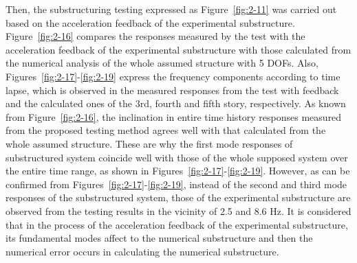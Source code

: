  Then, the substructuring testing expressed as Figure~\ref{fig:2-11} was carried out based on the acceleration feedback of the experimental substructure. Figure~\ref{fig:2-16} compares the responses measured by the test with the acceleration feedback of the experimental substructure with those calculated from the numerical analysis of the whole assumed structure with 5 DOFs. Also, Figures~\ref{fig:2-17}-\ref{fig:2-19} express the frequency components according to time lapse, which is observed in the measured responses from the test with feedback and the calculated ones of the 3rd, fourth and fifth story, respectively. As known from Figure~\ref{fig:2-16}, the inclination in entire time history responses measured from the proposed testing method agrees well with that calculated from the whole assumed structure. These are why the first mode responses of substructured system coincide well with those of the whole supposed system over the entire time range, as shown in Figures~\ref{fig:2-17}-\ref{fig:2-19}. However, as can be confirmed from Figures~\ref{fig:2-17}-\ref{fig:2-19}, instead of the second and third mode responses of the substructured system, those of the experimental substructure are observed from the testing results in the vicinity of 2.5 and 8.6 Hz. It is considered that in the process of the acceleration feedback of the experimental substructure, its fundamental modes affect to the numerical substructure and then the numerical error occurs in calculating the numerical substructure.

